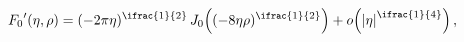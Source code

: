 \[\mathop{F_{0}\/}\nolimits'\!\left(\eta,\rho\right)=(-2\pi\eta)^{\ifrac{1}{2}}%
\mathop{J_{0}\/}\nolimits\!\left((-8\eta\rho)^{\ifrac{1}{2}}\right)+\mathop{o%
\/}\nolimits\!\left(\left|\eta\right|^{\ifrac{1}{4}}\right),\]